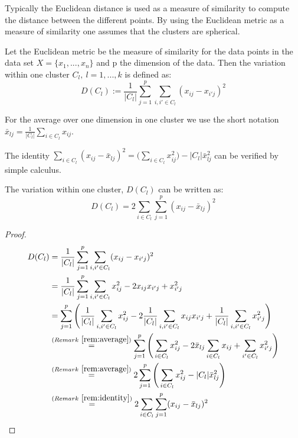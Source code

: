 Typically the Euclidean distance is used as a measure of similarity to compute the distance between the different points. By using the Euclidean metric as a measure of similarity one assumes that the clusters are spherical. 
\begin{definition}
	 Let the Euclidean metric be the measure of similarity for the data points in the data set $X=\{x_1, ..., x_n\}$ and p the dimension of the data. Then the variation within one cluster $C_l,~l=1, ..., k$ is defined as:  
	\begin{equation*}
		D(C_l) := \frac{1}{|C_l|}\sum_{j=1}^p \sum_{i,i' \in C_l} (x_{ij} - x_{i'j})^2
	\end{equation*}
\end{definition}

\begin{remark} \label{rem:average}
	For the average over one dimension in one cluster we use the short notation
	$\bar x_{lj} = \frac{1}{|C_l|} \sum_{i \in C_l} x_{ij}$.
\end{remark}

\begin{remark} \label{rem:identity}
 	The identity $\sum_{i \in C_l}(x_{ij}-\bar x_{lj})^2 = \big( \sum_{i \in C_l} x_{ij}^2 \big) - |C_l| \bar x_{lj}^2$ can be verified by simple calculus. 
\end{remark}

\begin{corollary}\label{equ:Steiner}
The variation within one cluster, $D(C_l)$ can be written as: 
	\begin{equation}
		D(C_l) =2 \sum_{i \in C_l} \sum_{j=1}^p (x_{ij}-\bar x_{lj})^2
	\end{equation}
\end{corollary}
\begin{proof}
	\begin{equation*}
	\begin{split} %
		D(C_l)	&= \frac{1}{|C_l|}\sum_{j=1}^p \sum_{i,i' \in C_l} (x_{ij} - x_{i'j})^2 \\
				&= \frac{1}{|C_l|}\sum_{j=1}^p \sum_{i,i' \in C_l} x_{ij}^2 - 2x_{ij} x_{i'j} + x_{i'j}^2 \\
				&= \sum_{j=1}^p \Bigg( \frac{1}{|C_l|} \sum_{i,i' \in C_l} x_{ij}^2 - 2 \frac{1}{|C_l|} \sum_{i,i' \in C_l} x_{ij} x_{i'j} + \frac{1}{|C_l|} \sum_{i,i' \in C_l} x_{i'j}^2 \Bigg) \\
				& \overset{(Remark~\ref{rem:average})}{=} \sum_{j=1}^p \Bigg( \sum_{i \in C_l} x_{ij}^2 - 2 \bar x_{lj} \sum_{i \in C_l} x_{ij} + \sum_{i' \in C_l} x_{i'j}^2 \Bigg) \\
				& \overset{(Remark~\ref{rem:average})}{=}2 \sum_{j=1}^p \Bigg( \sum_{i \in C_l} x_{ij}^2 - |C_l| \bar x_{lj}^2 \Bigg) \\
				& \overset{(Remark~\ref{rem:identity})}{=} 2 \sum_{i \in C_l} \sum_{j=1}^p (x_{ij}-\bar x_{lj})^2
	\end{split}
	\end{equation*}
\end{proof}

